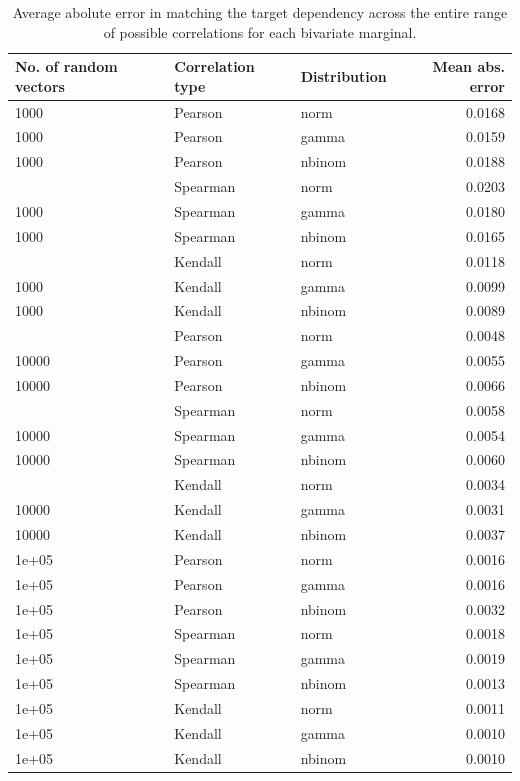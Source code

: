 \documentclass[
]{jss}
\begin{document}
\begin{CodeChunk}
\begin{table}

\caption{\label{tab:ch040-BiError}Average abolute error in matching the target dependency across the entire range of possible correlations for each bivariate marginal.}
\centering
\begin{tabular}[t]{lllr}
\toprule
No. of random vectors & Correlation type & Distribution & Mean abs. error\\
\midrule
1000 & Pearson & norm & 0.0168\\
1000 & Pearson & gamma & 0.0159\\
1000 & Pearson & nbinom & 0.0188\\
\addlinespace
1000 & Spearman & norm & 0.0203\\
1000 & Spearman & gamma & 0.0180\\
1000 & Spearman & nbinom & 0.0165\\
\addlinespace
1000 & Kendall & norm & 0.0118\\
1000 & Kendall & gamma & 0.0099\\
1000 & Kendall & nbinom & 0.0089\\
\addlinespace
10000 & Pearson & norm & 0.0048\\
10000 & Pearson & gamma & 0.0055\\
10000 & Pearson & nbinom & 0.0066\\
\addlinespace
10000 & Spearman & norm & 0.0058\\
10000 & Spearman & gamma & 0.0054\\
10000 & Spearman & nbinom & 0.0060\\
\addlinespace
10000 & Kendall & norm & 0.0034\\
10000 & Kendall & gamma & 0.0031\\
10000 & Kendall & nbinom & 0.0037\\
\addlinespace
1e+05 & Pearson & norm & 0.0016\\
1e+05 & Pearson & gamma & 0.0016\\
1e+05 & Pearson & nbinom & 0.0032\\
\addlinespace
1e+05 & Spearman & norm & 0.0018\\
1e+05 & Spearman & gamma & 0.0019\\
1e+05 & Spearman & nbinom & 0.0013\\
\addlinespace
1e+05 & Kendall & norm & 0.0011\\
1e+05 & Kendall & gamma & 0.0010\\
1e+05 & Kendall & nbinom & 0.0010\\
\bottomrule
\end{tabular}
\end{table}

\end{CodeChunk}
\end{document}
